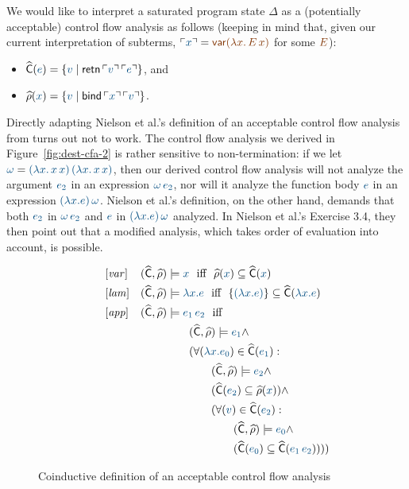 We would like to interpret a saturated program state $\Delta$ as a
(potentially acceptable) control flow analysis as follows (keeping in
mind that, given our current interpretation of subterms, $\interp{x} =
\lf{{\sf var}(\lambda x.\,E\,x)}$ for some $\lf{E}$):
%
\smallskip
%
\begin{itemize}
\item $\widehat{\sf C}(\obj{e}) = \{ \obj{v} \mid {\sf retn}\,\interp{v}\,\interp{e} \}$, and
\item $\widehat{\rho}(\obj{x}) = \{ \obj{v} \mid {\sf bind}\,\interp{x}\,\interp{v} \}$.
\end{itemize}
%
\smallskip
%
Directly adapting Nielson et al.'s definition of an acceptable control
flow analysis from \cite[Table 3.1]{nielson05principles} turns out not
to work. The control flow analysis we derived in
Figure~\ref{fig:dest-cfa-2} is rather sensitive to non-termination: if
we let $\obj{\omega} = \obj{(\lambda x.\,x\,x)\,(\lambda x.\,x\,x)}$,
then our derived control flow analysis will not analyze the argument
$\obj{e_2}$ in an expression $\obj{\omega\,e_2}$, nor will it analyze
the function body $\obj{e}$ in an expression $\obj{(\lambda
  x.e)\,\omega}$. Nielson et al.'s definition, on the other hand,
demands that both $\obj{e_2}$ in $\obj{\omega\,e_2}$ and $\obj{e}$ in
$\obj{(\lambda x.e)\,\omega}$ analyzed. In Nielson et al.'s Exercise
3.4, they then point out that a modified analysis, which takes order
of evaluation into account, is possible.

\begin{figure}
\begin{align*}
& [{\it var}] & (\widehat{\sf C}, \widehat{\rho}) & \models
  \obj{x} 
  \mbox{~~iff~~} \widehat{\rho}(\obj{x})
    \subseteq \widehat{\sf C}(\obj{x})
\\
& [{\it lam}] & (\widehat{\sf C}, \widehat{\rho}) & \models
  \obj{\lambda x.e}
  \mbox{~~iff~~} \{ \obj{(\lambda x.e)} \} 
    \subseteq \widehat{\sf C}(\obj{\lambda x.e})
\\
\qquad\qquad\qquad& [{\it app}] & (\widehat{\sf C}, \widehat{\rho}) & \models
  \obj{e_1\,e_2} \mbox{~~iff}
\\
& & & \qquad (\widehat{\sf C}, \widehat{\rho}) \models \obj{e_1} \wedge ~
\\
& & & \qquad (\forall(\obj{\lambda x.e_0}) \in \widehat{\sf C}(\obj{e_1}) : ~
\\
& & & \qquad\qquad (\widehat{\sf C}, \widehat{\rho}) \models \obj{e_2} \wedge ~
\\
& & & \qquad\qquad (\widehat{\sf C}(\obj{e_2}) \subseteq \widehat{\rho}(\obj{x})) \wedge ~
\\
& & & \qquad\qquad (\forall(\obj{v}) \in \widehat{\sf C}(\obj{e_2}) : 
\\
& & & \qquad\qquad\qquad (\widehat{\sf C}, \widehat{\rho}) \models \obj{e_0} \wedge ~
\\
& & & \qquad\qquad\qquad(\widehat{\sf C}(\obj{e_0}) \subseteq \widehat{\sf C}(\obj{e_1\,e_2}))))\qquad\qquad\qquad
\end{align*}
\caption{Coinductive definition of an acceptable control flow analysis}
\label{fig:acceptablecontrolflowanalysis}
\end{figure}

